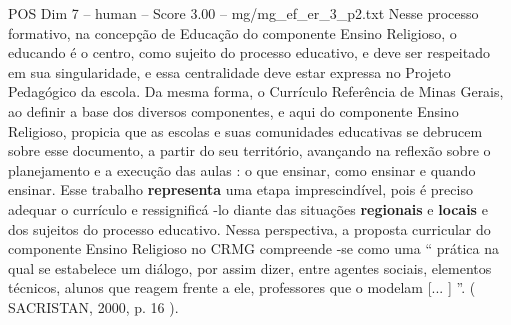 \begin{textsample}{POS Dim 7 – human – Score 3.00 – mg/mg\_ef\_er\_3\_p2.txt}  \label{ex:f7_pos_013}
Nesse processo formativo, na concepção de Educação do componente Ensino Religioso, o educando é o centro, como sujeito do processo educativo, e deve ser respeitado em sua singularidade, e essa centralidade deve estar expressa no Projeto Pedagógico da escola.
Da mesma forma, o Currículo Referência de Minas Gerais, ao definir a base dos diversos componentes, e aqui do componente Ensino Religioso, propicia que as escolas e suas comunidades educativas se debrucem sobre esse documento, a partir do seu território, avançando na reflexão sobre o planejamento e a execução das aulas : o que ensinar, como ensinar e quando ensinar.
Esse trabalho \textbf{representa} uma etapa imprescindível, pois é preciso adequar o currículo e ressignificá -lo diante das situações \textbf{regionais} e \textbf{locais} e dos sujeitos do processo educativo.
Nessa perspectiva, a proposta curricular do componente Ensino Religioso no CRMG compreende -se como uma “ prática na qual se estabelece um diálogo, por assim dizer, entre agentes sociais, elementos técnicos, alunos que reagem frente a ele, professores que o modelam [... ] ”. ( SACRISTAN, 2000, p. 16 ).

\end{textsample}

